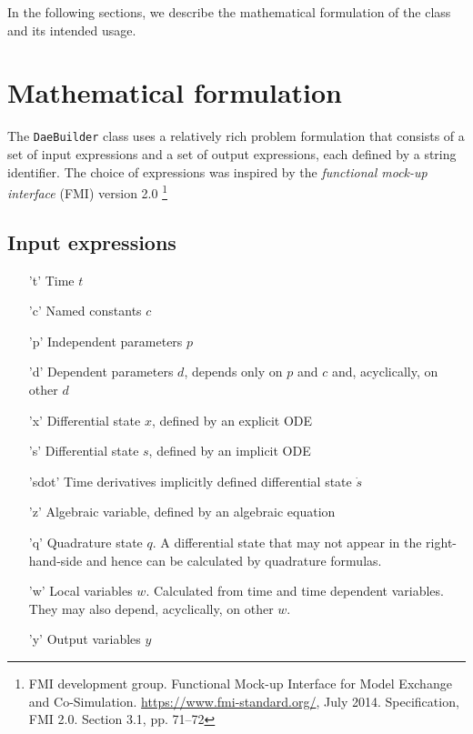 \documentclass[a4paper,12pt]{book}
\begin{document}
In the following sections, we describe the mathematical formulation of the class
and its intended usage.

\section{Mathematical formulation} \label{sec:daebuilder_io}
The \texttt{DaeBuilder} class uses a relatively rich problem formulation that
consists of a set of input expressions and a set of output expressions, each
defined by a string identifier. The choice of expressions was inspired by the
\emph{functional mock-up interface} (FMI) version 2.0
\footnote{FMI development group. Functional Mock-up Interface for Model Exchange and Co-Simulation. \url{https://www.fmi-standard.org/}, July 2014. Specification, FMI 2.0. Section 3.1, pp. 71–72}

\subsection*{Input expressions}
\begin{enumerate}
  \item['t'] Time $t$
  \item['c'] Named constants $c$
  \item['p'] Independent parameters $p$
  \item['d'] Dependent parameters $d$, depends only on $p$ and $c$ and,
  acyclically, on other $d$
  \item['x'] Differential state $x$, defined by an explicit ODE
  \item['s'] Differential state $s$, defined by an implicit ODE
  \item['sdot'] Time derivatives implicitly defined differential state $\dot{s}$
  \item['z'] Algebraic variable, defined by an algebraic equation
  \item['q'] Quadrature state $q$. A differential state that may not appear in
  the right-hand-side and hence can be calculated by quadrature formulas.
  \item['w'] Local variables $w$. Calculated from time and time dependent
  variables. They may also depend, acyclically, on other $w$.
  \item['y'] Output variables $y$
\end{enumerate}
\end{document}
